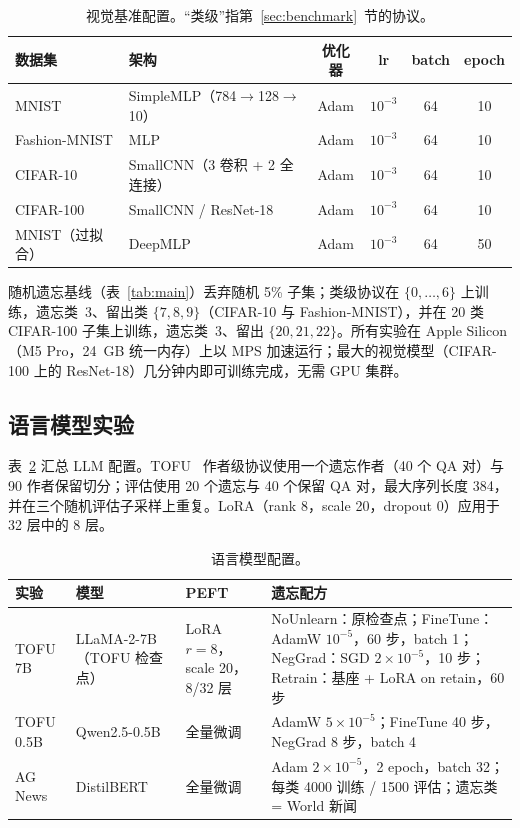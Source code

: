 \begin{table}[t]
\centering
\small
\caption{视觉基准配置。``类级''指第~\ref{sec:benchmark}~节的协议。}\label{tab:exp_vision}
\setlength{\tabcolsep}{2pt}
\begin{tabular}{l l c c c c}
\toprule
数据集 & 架构 & 优化器 & lr & batch & epoch \\
\midrule
MNIST & SimpleMLP（784$\to$128$\to$10） & Adam & $10^{-3}$ & 64 & 10 \\
Fashion-MNIST & MLP & Adam & $10^{-3}$ & 64 & 10 \\
CIFAR-10 & SmallCNN（3 卷积 + 2 全连接） & Adam & $10^{-3}$ & 64 & 10 \\
CIFAR-100 & SmallCNN / ResNet-18 & Adam & $10^{-3}$ & 64 & 10 \\
MNIST（过拟合） & DeepMLP & Adam & $10^{-3}$ & 64 & 50 \\
\bottomrule
\end{tabular}
\end{table}

随机遗忘基线（表~\ref{tab:main}）丢弃随机 5\% 子集；类级协议在 $\{0,\dots,6\}$ 上训练，遗忘类~3、留出类 $\{7,8,9\}$（CIFAR-10 与 Fashion-MNIST），并在 20 类 CIFAR-100 子集上训练，遗忘类~3、留出 $\{20,21,22\}$。所有实验在 Apple Silicon（M5 Pro，24~GB 统一内存）上以 MPS 加速运行；最大的视觉模型（CIFAR-100 上的 ResNet-18）几分钟内即可训练完成，无需 GPU 集群。

\subsection{语言模型实验}

表~\ref{tab:exp_llm} 汇总 LLM 配置。TOFU~\cite{maini2024tofu} 作者级协议使用一个遗忘作者（40 个 QA 对）与 90 作者保留切分；评估使用 20 个遗忘与 40 个保留 QA 对，最大序列长度 384，并在三个随机评估子采样上重复。LoRA（rank 8，scale 20，dropout 0）应用于 32 层中的 8 层。

\begin{table}[t]
\centering
\small
\caption{语言模型配置。}\label{tab:exp_llm}
\setlength{\tabcolsep}{2pt}
\begin{tabular}{l l l l}
\toprule
实验 & 模型 & PEFT & 遗忘配方 \\
\midrule
TOFU 7B & LLaMA-2-7B（TOFU 检查点） & LoRA $r{=}8$，scale 20，8/32 层 & NoUnlearn：原检查点；FineTune：AdamW $10^{-5}$，60 步，batch 1；NegGrad：SGD $2{\times}10^{-5}$，10 步；Retrain：基座 + LoRA on retain，60 步 \\
TOFU 0.5B & Qwen2.5-0.5B & 全量微调 & AdamW $5{\times}10^{-5}$；FineTune 40 步，NegGrad 8 步，batch 4 \\
AG News & DistilBERT & 全量微调 & Adam $2{\times}10^{-5}$，2 epoch，batch 32；每类 4000 训练 / 1500 评估；遗忘类 = World 新闻 \\
\bottomrule
\end{tabular}
\end{table}

